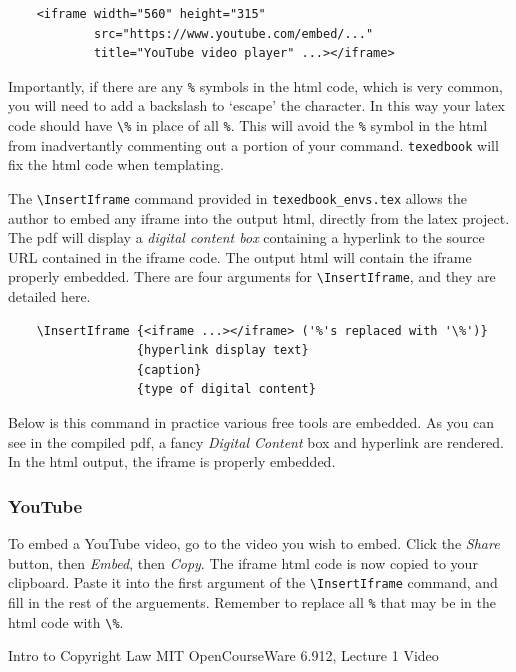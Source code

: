 \documentclass{article}
\begin{document}
\begin{verbatim}
    <iframe width="560" height="315" 
            src="https://www.youtube.com/embed/..." 
            title="YouTube video player" ...></iframe>
\end{verbatim}

Importantly, if there are any \verb'%' symbols in the html code, which is very common, you will need to add a backslash to `escape' the character. In this way your latex code should have \verb'\%' in place of all \verb'%'. This will avoid the \verb'%' symbol in the html from inadvertantly commenting out a portion of your command. \verb'texedbook' will fix the html code when templating.  

The \verb'\InsertIframe' command provided in \verb'texedbook_envs.tex' allows the author to embed any iframe into the output html, directly from the latex project. The pdf will display a \textit{digital content box} containing a hyperlink to the source URL contained in the iframe code. The output html will contain the iframe properly embedded. There are four arguments for \verb'\InsertIframe', and they are detailed here.
\begin{verbatim}
    \InsertIframe {<iframe ...></iframe> ('%'s replaced with '\%')}
                  {hyperlink display text}
                  {caption}
                  {type of digital content}
\end{verbatim}  

Below is this command in practice various free tools are embedded. As you can see in the compiled pdf, a fancy \textit{Digital Content} box and hyperlink are rendered. In the html output, the iframe is properly embedded.

\subsubsection{YouTube}
To embed a YouTube video, go to the video you wish to embed. Click the \textit{Share} button, then \textit{Embed}, then \textit{Copy}. The iframe html code is now copied to your clipboard. Paste it into the first argument of the \verb'\InsertIframe' command, and fill in the rest of the arguements. Remember to replace all \verb'%' that may be in the html code with \verb'\%'.

             {Intro to Copyright Law}
             {MIT OpenCourseWare 6.912, Lecture 1}
             {Video} 
\end{document}
